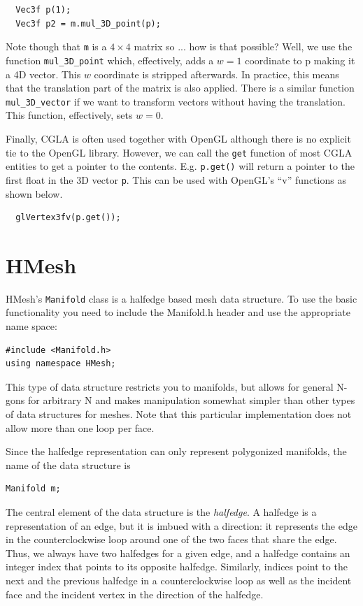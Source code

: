 \documentclass[a4paper]{article}
\begin{document}
\begin{verbatim}
  Vec3f p(1);
  Vec3f p2 = m.mul_3D_point(p);
\end{verbatim}

Note though that \texttt{m} is a $4\times
4$ matrix so ... how is that possible? Well, we use the function
\texttt{mul\_3D\_point} which, effectively, adds a $w=1$ coordinate to p
making it a 4D vector. This $w$ coordinate is stripped afterwards. In
practice, this means that the translation part of the matrix is also
applied. There is a similar function \texttt{mul\_3D\_vector} if we want
to transform vectors without having the translation. This function,
effectively, sets $w=0$.

Finally, CGLA is often used together with OpenGL although there is no
explicit tie to the OpenGL library. However, we can call the
\texttt{get} function of most CGLA entities to get a pointer to the
contents. E.g. \texttt{p.get()} will return a pointer to the first
float in the 3D vector \texttt{p}. This can be used with OpenGL's
``v'' functions as shown below. 

\begin{verbatim}
  glVertex3fv(p.get());
\end{verbatim}

\section{HMesh}

HMesh's \texttt{Manifold} class is a halfedge based mesh data structure. To use the basic functionality you need to include the Manifold.h header and use the appropriate name space:
\begin{verbatim}
#include <Manifold.h>
using namespace HMesh;
\end{verbatim}
This type of data structure restricts you to manifolds, but allows for general N-gons for arbitrary N and makes manipulation somewhat simpler than other types of data structures for meshes.  Note that this particular implementation does not allow more than one loop per face. 

Since the halfedge representation can only represent polygonized manifolds, the name of the data structure is
\begin{verbatim}
Manifold m;
\end{verbatim}
The central element of the data structure is the \textit{halfedge}. A halfedge is a representation of an edge, but it is imbued with a direction: it represents the edge in the counterclockwise loop around one of the two faces that share the edge. Thus, we always have two halfedges for a given edge, and a halfedge contains an integer index that points to its opposite halfedge. Similarly, indices point to the next and the previous halfedge in a counterclockwise loop as well as the incident face and the incident vertex in the direction of the halfedge.
\end{document}
